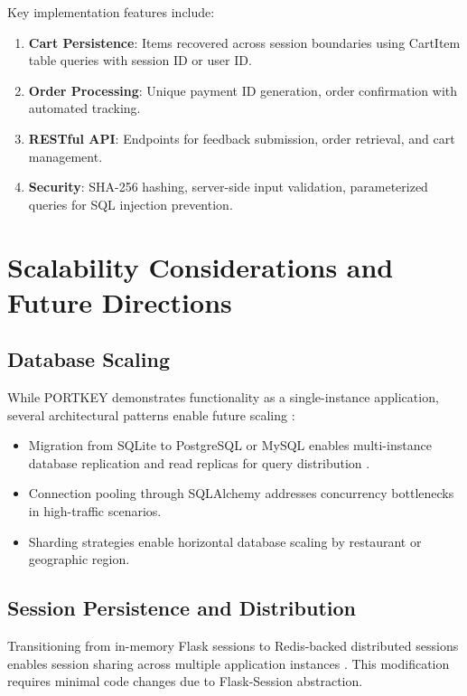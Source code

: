 \documentclass[conference]{IEEEtran}
\begin{document}
Key implementation features include:

\begin{enumerate}
    \item \textbf{Cart Persistence}: Items recovered across session boundaries using CartItem table queries with session ID or user ID.
    \item \textbf{Order Processing}: Unique payment ID generation, order confirmation with automated tracking.
    \item \textbf{RESTful API}: Endpoints for feedback submission, order retrieval, and cart management.
    \item \textbf{Security}: SHA-256 hashing, server-side input validation, parameterized queries for SQL injection prevention.
\end{enumerate}

\section{Scalability Considerations and Future Directions}

\subsection{Database Scaling}

While PORTKEY demonstrates functionality as a single-instance application, several architectural patterns enable future scaling \cite{b77, b78, b85}:

\begin{itemize}
    \item Migration from SQLite to PostgreSQL or MySQL enables multi-instance database replication and read replicas for query distribution \cite{b64}.
    \item Connection pooling through SQLAlchemy addresses concurrency bottlenecks in high-traffic scenarios.
    \item Sharding strategies enable horizontal database scaling by restaurant or geographic region.
\end{itemize}

\subsection{Session Persistence and Distribution}

Transitioning from in-memory Flask sessions to Redis-backed distributed sessions enables session sharing across multiple application instances \cite{b62, b65}. This modification requires minimal code changes due to Flask-Session abstraction.
\end{document}
